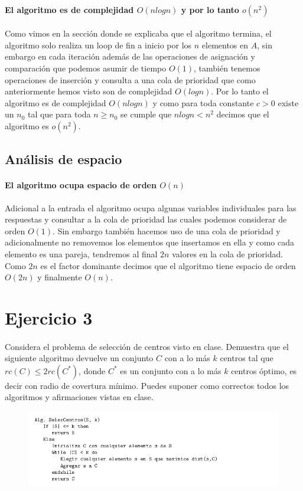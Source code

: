 \documentclass[12pt]{article}
\begin{document}
\paragraph{El algoritmo es de complejidad $O(nlogn)$ y por lo tanto $o(n^2)$} Como vimos en la sección donde se explicaba que el algoritmo termina, el algoritmo solo realiza un loop de fin a inicio por los $n$ elementos en $A$, sin embargo en cada iteración además de las operaciones de asignación y comparación que podemos asumir de tiempo $O(1)$, también tenemos operaciones de inserción y consulta a una cola de prioridad que como anteriormente hemos visto son de complejidad $O(logn)$. Por lo tanto el algoritmo es de complejidad $O(nlogn)$ y como para toda constante $c>0$ existe un $n_0$ tal que para toda $n\geq n_0$ se cumple que $nlogn < n^2$ decimos que el algoritmo es $o(n^2)$.
\subsection{Análisis de espacio}
\paragraph{El algoritmo ocupa espacio de orden $O(n)$} 
Adicional a la entrada el algoritmo ocupa algunas variables individuales para las respuestas y consultar a la cola de prioridad las cuales podemos considerar de orden $O(1)$. Sin embargo también hacemos uso de una cola de prioridad y adicionalmente no removemos los elementos que insertamos en ella y como cada elemento es una pareja, tendremos al final $2n$ valores en la cola de prioridad. Como $2n$ es el factor dominante decimos que el algoritmo tiene espacio de orden $O(2n)$ y finalmente $O(n)$.
\section{Ejercicio 3}
	\paragraph{} Considera el problema de selección de centros visto en clase. Demuestra que el siguiente algoritmo devuelve un conjunto $C$ con a lo más $k$ centros tal que $rc(C)\leq 2rc(C^*)$, donde $C^*$ es un conjunto con a lo más $k$ centros óptimo, es decir con radio de covertura mínimo. Puedes suponer como correctos todos los algoritmos y afirmaciones vistas en clase.
	\begin{figure}[h]
		\begin{center}
			\includegraphics[width=\textwidth]{AlgCentros}
		\end{center}
	\end{figure}
\pagebreak
\end{document}
